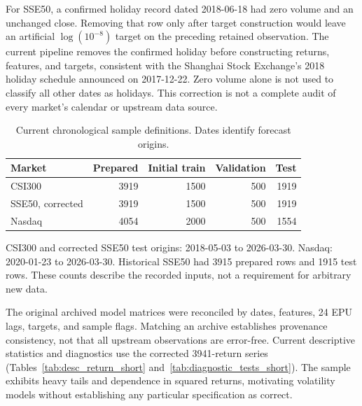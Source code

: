 For SSE50, a confirmed holiday record dated 2018-06-18 had zero volume and an unchanged close. Removing that row only after target construction would leave an artificial $\log(10^{-8})$ target on the preceding retained observation. The current pipeline removes the confirmed holiday before constructing returns, features, and targets, consistent with the Shanghai Stock Exchange's 2018 holiday schedule announced on 2017-12-22. Zero volume alone is not used to classify all other dates as holidays. This correction is not a complete audit of every market's calendar or upstream data source.

\begin{table}[htbp]\centering
\caption{Current chronological sample definitions. Dates identify forecast origins.}
\begin{tabular}{lrrrr}\toprule
Market & Prepared & Initial train & Validation & Test\\\midrule
CSI300 & 3919 & 1500 & 500 & 1919\\
SSE50, corrected & 3919 & 1500 & 500 & 1919\\
Nasdaq & 4054 & 2000 & 500 & 1554\\\bottomrule
\end{tabular}
\begin{flushleft}\small CSI300 and corrected SSE50 test origins: 2018-05-03 to 2026-03-30. Nasdaq: 2020-01-23 to 2026-03-30. Historical SSE50 had 3915 prepared rows and 1915 test rows. These counts describe the recorded inputs, not a requirement for arbitrary new data.\end{flushleft}
\label{tab:samples}
\end{table}

The original archived model matrices were reconciled by dates, features, 24 EPU lags, targets, and sample flags. Matching an archive establishes provenance consistency, not that all upstream observations are error-free. Current descriptive statistics and diagnostics use the corrected 3941-return series (Tables~\ref{tab:desc_return_short} and~\ref{tab:diagnostic_tests_short}). The sample exhibits heavy tails and dependence in squared returns, motivating volatility models without establishing any particular specification as correct.

